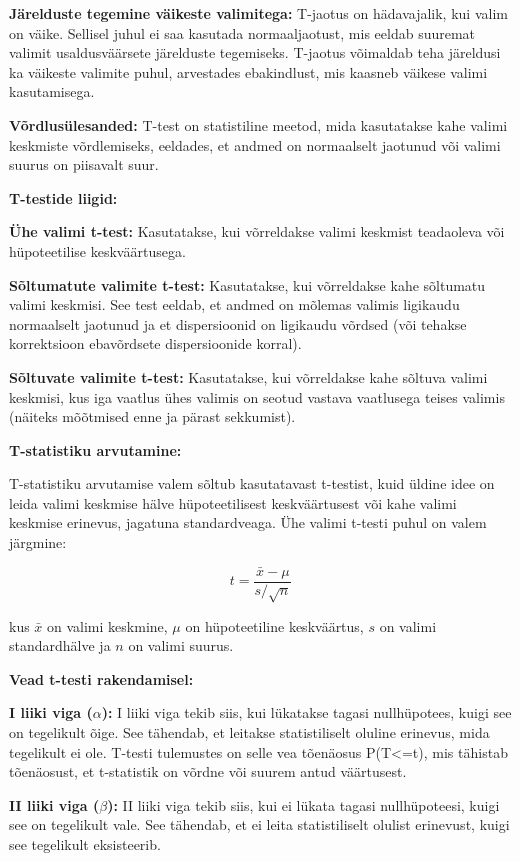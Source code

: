 \documentclass[
]{book}
\theoremstyle{definition}
\theoremstyle{definition}
\theoremstyle{definition}
\theoremstyle{definition}
\theoremstyle{remark}
\begin{document}
\textbf{Järelduste tegemine väikeste valimitega:} T-jaotus on hädavajalik, kui valim on väike. Sellisel juhul ei saa kasutada normaaljaotust, mis eeldab suuremat valimit usaldusväärsete järelduste tegemiseks. T-jaotus võimaldab teha järeldusi ka väikeste valimite puhul, arvestades ebakindlust, mis kaasneb väikese valimi kasutamisega.

\textbf{Võrdlusülesanded:} T-test on statistiline meetod, mida kasutatakse kahe valimi keskmiste võrdlemiseks, eeldades, et andmed on normaalselt jaotunud või valimi suurus on piisavalt suur.

\textbf{T-testide liigid:}

\textbf{Ühe valimi t-test:} Kasutatakse, kui võrreldakse valimi keskmist teadaoleva või hüpoteetilise keskväärtusega.

\textbf{Sõltumatute valimite t-test:} Kasutatakse, kui võrreldakse kahe sõltumatu valimi keskmisi. See test eeldab, et andmed on mõlemas valimis ligikaudu normaalselt jaotunud ja et dispersioonid on ligikaudu võrdsed (või tehakse korrektsioon ebavõrdsete dispersioonide korral).

\textbf{Sõltuvate valimite t-test:} Kasutatakse, kui võrreldakse kahe sõltuva valimi keskmisi, kus iga vaatlus ühes valimis on seotud vastava vaatlusega teises valimis (näiteks mõõtmised enne ja pärast sekkumist).

\textbf{T-statistiku arvutamine:}

T-statistiku arvutamise valem sõltub kasutatavast t-testist, kuid üldine idee on leida valimi keskmise hälve hüpoteetilisest keskväärtusest või kahe valimi keskmise erinevus, jagatuna standardveaga. Ühe valimi t-testi puhul on valem järgmine:

\[t = \frac{\bar{x} - \mu}{s / \sqrt{n}}\]

kus \(\bar{x}\) on valimi keskmine, \(\mu\) on hüpoteetiline keskväärtus, \(s\) on valimi standardhälve ja \(n\) on valimi suurus.

\textbf{Vead t-testi rakendamisel:}

\textbf{I liiki viga (\(\alpha\)):} I liiki viga tekib siis, kui lükatakse tagasi nullhüpotees, kuigi see on tegelikult õige. See tähendab, et leitakse statistiliselt oluline erinevus, mida tegelikult ei ole. T-testi tulemustes on selle vea tõenäosus P(T\textless=t), mis tähistab tõenäosust, et t-statistik on võrdne või suurem antud väärtusest.

\textbf{II liiki viga (\(\beta\)):} II liiki viga tekib siis, kui ei lükata tagasi nullhüpoteesi, kuigi see on tegelikult vale. See tähendab, et ei leita statistiliselt olulist erinevust, kuigi see tegelikult eksisteerib.
\end{document}

